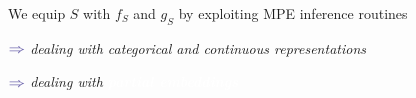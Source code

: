 \documentclass[xcolor={usenames,dvipsnames,svgnames}, compress]{beamer}
\newcommand{\argmax}{\operatornamewithlimits{argmax}}
\newcommand{\cbar}{\,|\,}
\newcommand{\highlighttext}[2][yellow]{{\colorbox{#1}{\textcolor{white}{#2}}}}
\newcommand{\customcitenomark}[1]{\footnotenomarkleft{\tiny
    \citeauthor{#1}, \citetitle{#1}, \citeyear{#1}}}
\begin{document}
\begin{frame}[t]
We equip $S$ with $f_{S}$ and $g_{S}$ by exploiting MPE inference routines
\begin{minipage}{1.0\linewidth}
  \vspace{5pt}
  \raggedleft
  $\color{violet}\boldsymbol\Rightarrow$
      {\scriptsize
     \emph{dealing with categorical and continuous representations}}\par
      $\color{violet}\boldsymbol\Rightarrow$
      {\scriptsize
     \emph{dealing with \highlighttext[tomato0]{\emph{\textbf{partial embeddings}}}}}
   \end{minipage}\par\bigskip







\end{frame}
\end{document}
